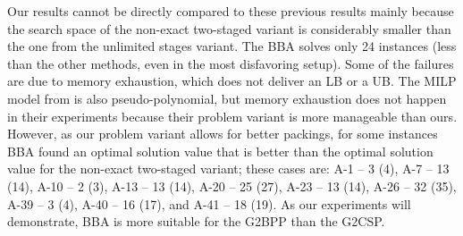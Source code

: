Our results cannot be directly compared to these previous results mainly because the search space of the non-exact two-staged variant is considerably smaller than the one from the unlimited stages variant.
The BBA solves only 24 instances (less than the other methods, even in the most disfavoring setup).
Some of the failures are due to memory exhaustion, which does not deliver an LB or a UB.
The MILP model from \citet{macedo:2010} is also pseudo-polynomial, but memory exhaustion does not happen in their experiments because their problem variant is more manageable than ours.
However, as our problem variant allows for better packings, for some instances BBA found an optimal solution value that is better than the optimal solution value for the non-exact two-staged variant; these cases are: A-1 -- 3 (4), A-7 -- 13 (14), A-10 -- 2 (3), A-13 -- 13 (14), A-20 -- 25 (27), A-23 -- 13 (14), A-26 -- 32 (35), A-39 -- 3 (4), A-40 -- 16 (17), and A-41 -- 18 (19).
As our experiments will demonstrate, BBA is more suitable for the G2BPP than the G2CSP.


